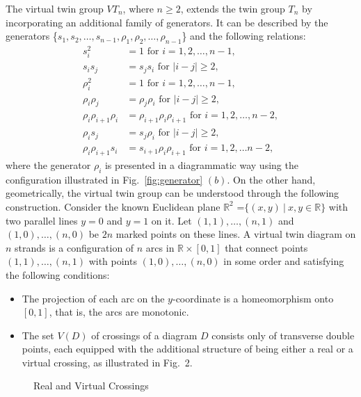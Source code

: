 \documentclass[preprint]{elsarticle}
\begin{document}
The virtual twin group $VT_n$, where $n\geq 2$, extends the twin group $T_n$ by incorporating an additional family of generators. It can be described by the generators \{$s_1,s_2, \dots,s_{n-1},\rho_1,\rho_2,\dots,\rho_{n-1} $\} and the following relations:
\begin{align}
    s_i^2 &= 1 \text{  for } i =1,2,\dots ,n-1,\\
    s_is_j &= s_js_i \text{ for } |i-j|\geq 2,\\
    \rho_i^2 &= 1 \text{ for } i=1,2,\dots,n-1,\\
    \rho_i \rho_j &= \rho_j \rho_i \text{ for } |i-j|\geq 2,\\
    \rho_i\rho_{i+1}\rho_i &= \rho_{i+1} \rho_i \rho_{i+1} \text{ for } i=1,2,\dots,n-2,\\
    \rho_i s_j &= s_j\rho_i \text{ for } |i-j|\geq 2,\\
    \rho_i \rho_{i+1} s_i &= s_{i+1} \rho_i \rho_{i+1} \text{ for } i=1,2,\dots n-2,
\end{align}
where the generator $\rho_i$ is presented in a diagrammatic way using the configuration illustrated in  Fig.~\ref{fig:generator} $(b)$. On the other hand, geometrically, the virtual twin group can be understood through the following construction. Consider the known Euclidean plane $\mathbb{R}^2$ =$\{(x,y) ~|~ x,y \in \mathbb{R} \}$ with two parallel lines $y=0$ and $y=1$ on it. Let \((1,1), \ldots, (n,1)\) and \((1,0), \ldots, (n,0)\) be $2n$ marked points on these lines. A virtual twin diagram on $n$ strands is a configuration of $n$ arcs in $\mathbb{R} \times [0,1]$ that connect points $(1,1), \dots,(n,1)$ with points $(1,0),\dots,(n,0)$ in some order and satisfying the following conditions:
\begin{itemize}
    \item The projection of each arc on the $y$-coordinate is a homeomorphism onto $[0,1]$, that is, the arcs are monotonic.
   \item The set \( V(D) \) of crossings of a diagram \( D \) consists only of transverse double points, each equipped with the additional structure of being either a real or a virtual crossing, as illustrated in Fig.~2.
\end{itemize}
\begin{figure}
    \centering
    \caption{Real and Virtual Crossings}
    \label{fig:placeholder}
\end{figure}
\end{document}
